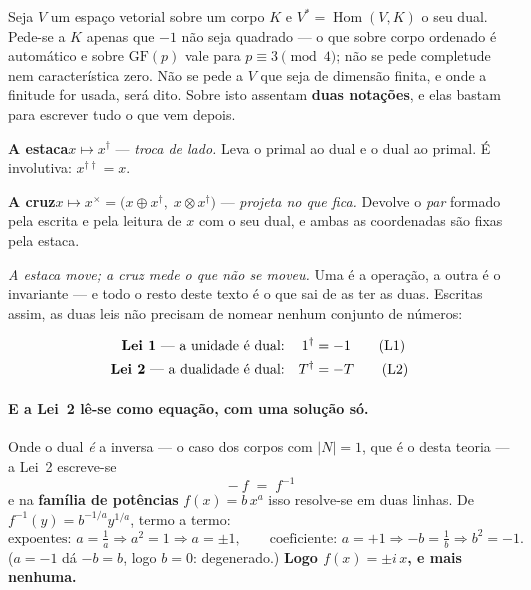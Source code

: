 \documentclass[livro.tex]{subfiles}
\begin{document}
\medskip
\noindent Seja $V$ um espaço vetorial sobre um corpo $K$ e $V^{*}=\operatorname{Hom}(V,K)$ o seu
dual. Pede-se a $K$ apenas que $-1$ não seja quadrado --- o que sobre corpo ordenado é automático e sobre $\mathrm{GF}(p)$ vale para $p\equiv3\pmod4$; não se pede completude nem característica zero. Não se pede a
$V$ que seja de dimensão finita, e onde a finitude for usada, será dito. Sobre isto assentam
\textbf{duas notações}, e elas bastam para escrever tudo o que vem depois.

\begin{mdframed}[linewidth=0.4pt,innerleftmargin=10pt,innerrightmargin=10pt,
                 innertopmargin=8pt,innerbottommargin=8pt,skipabove=6pt,skipbelow=6pt]
\textbf{A estaca}\quad $x \mapsto x^{\dagger}$ \quad --- \emph{troca de lado.} Leva o primal ao
dual e o dual ao primal. É involutiva: $x^{\dagger\dagger}=x$.

\medskip
\textbf{A cruz}\quad $x \mapsto x^{\times} = \bigl(x \oplus x^{\dagger},\; x \otimes
x^{\dagger}\bigr)$ \quad --- \emph{projeta no que fica.} Devolve o \emph{par} formado pela escrita
e pela leitura de $x$ com o seu dual, e ambas as coordenadas são fixas pela estaca.
\end{mdframed}

\noindent \emph{A estaca move; a cruz mede o que não se moveu.} Uma é a operação, a outra é o
invariante --- e todo o resto deste texto é o que sai de as ter as duas. Escritas assim, as duas
leis não precisam de nomear nenhum conjunto de números:

\begin{align}
\text{\textbf{Lei 1} --- a unidade é dual:} && 1^{\dagger} &= -1 \tag{L1}\\
\text{\textbf{Lei 2} --- a dualidade é dual:} && T^{\dagger} &= -T \tag{L2}
\end{align}

\paragraph{E a Lei~2 lê-se como equação, com uma solução só.} Onde o dual \emph{é} a inversa ---
o caso dos corpos com $|N|=1$, que é o desta teoria --- a Lei~2 escreve-se
\[
  \boxed{\;-f \;=\; f^{-1}\;}
\]
e na \textbf{família de potências} $f(x)=b\,x^{a}$ isso resolve-se em duas linhas. De
$f^{-1}(y)=b^{-1/a}y^{1/a}$, termo a termo:
\[
  \text{expoentes: } a=\tfrac1a \Rightarrow a^{2}=1 \Rightarrow a=\pm1, \qquad
  \text{coeficiente: } a{=}{+}1 \Rightarrow -b=\tfrac1b \Rightarrow b^{2}=-1 .
\]
($a=-1$ dá $-b=b$, logo $b=0$: degenerado.) \textbf{Logo $f(x)=\pm i\,x$, e mais nenhuma.}
\end{document}
